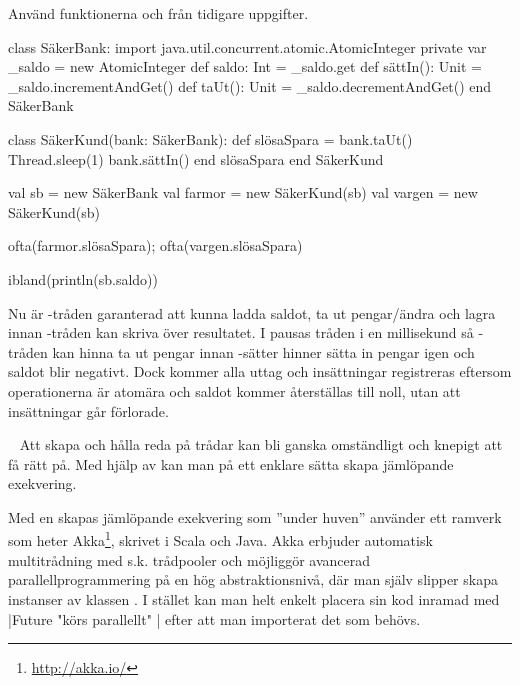 Använd funktionerna  och  från tidigare uppgifter.
\begin{Code}
class SäkerBank:
  import java.util.concurrent.atomic.AtomicInteger
  private var _saldo = new AtomicInteger
  def saldo: Int = _saldo.get
  def sättIn(): Unit = _saldo.incrementAndGet()
  def taUt(): Unit   = _saldo.decrementAndGet()
end SäkerBank

class SäkerKund(bank: SäkerBank):
  def slösaSpara = 
    bank.taUt()
    Thread.sleep(1)
    bank.sättIn()
  end slösaSpara
end SäkerKund

\end{Code}
\begin{REPL}
val sb = new SäkerBank
val farmor = new SäkerKund(sb)
val vargen = new SäkerKund(sb)

ofta(farmor.slösaSpara); ofta(vargen.slösaSpara)

ibland(println(sb.saldo))
\end{REPL}


\SOLUTION


\TaskSolved \what

Nu är -tråden garanterad att kunna ladda saldot, ta ut pengar/ändra och lagra innan -tråden kan skriva över resultatet. I  pausas tråden i en millisekund så -tråden kan hinna ta ut pengar innan -sätter hinner sätta in pengar igen och saldot blir negativt. Dock kommer alla uttag och insättningar registreras eftersom operationerna är atomära och saldot kommer återställas till noll, utan att insättningar går förlorade.


\QUESTEND







\QUESTBEGIN

\Task \label{task:future} \what~   Att skapa och hålla reda på trådar kan bli ganska omständligt och knepigt att få rätt på.
Med hjälp av  kan man på ett enklare sätta skapa jämlöpande exekvering.

\begin{Background}
Med en  skapas jämlöpande exekvering som ''under huven'' använder ett ramverk som heter Akka\footnote{\url{http://akka.io/}}, skrivet i Scala och Java. Akka erbjuder automatisk  multitrådning med s.k. trådpooler och möjliggör avancerad parallellprogrammering på en hög  abstraktionsnivå, där man själv slipper skapa instanser av klassen . I stället kan man helt enkelt placera sin kod inramad med \code|Future{ "körs parallellt" }| efter att man importerat det som behövs.
\end{Background}

